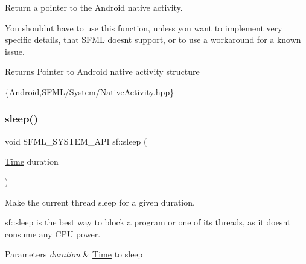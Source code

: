 Return a pointer to the Android native activity. 

You shouldn\textquotesingle{}t have to use this function, unless you want to implement very specific details, that S\+F\+ML doesn\textquotesingle{}t support, or to use a workaround for a known issue.

\begin{DoxyReturn}{Returns}
Pointer to Android native activity structure
\end{DoxyReturn}
\{Android,\hyperlink{_native_activity_8hpp_source}{S\+F\+M\+L/\+System/\+Native\+Activity.\+hpp}\} \mbox{\label{group__system_ga2f2620831533dee0ed432ed982342e09}} 
\subsubsection{\texorpdfstring{sleep()}{sleep()}}
{\footnotesize\ttfamily void S\+F\+M\+L\+\_\+\+S\+Y\+S\+T\+E\+M\+\_\+\+A\+PI sf\+::sleep (\begin{DoxyParamCaption}\item[{\hyperlink{classsf_1_1_time}{Time}}]{duration }\end{DoxyParamCaption})}



Make the current thread sleep for a given duration. 

sf\+::sleep is the best way to block a program or one of its threads, as it doesn\textquotesingle{}t consume any C\+PU power.


\begin{DoxyParams}{Parameters}
{\em duration} & \hyperlink{classsf_1_1_time}{Time} to sleep \\
\hline
\end{DoxyParams}

